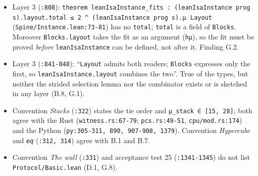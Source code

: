 \begin{itemize}
\item Layer 3 (\texttt{:808}): \texttt{t\allowbreak{}h\allowbreak{}e\allowbreak{}o\allowbreak{}r\allowbreak{}e\allowbreak{}m\allowbreak{} l\allowbreak{}e\allowbreak{}a\allowbreak{}n\allowbreak{}I\allowbreak{}s\allowbreak{}a\allowbreak{}I\allowbreak{}n\allowbreak{}s\allowbreak{}t\allowbreak{}a\allowbreak{}n\allowbreak{}c\allowbreak{}e\allowbreak{}\_\allowbreak{}f\allowbreak{}i\allowbreak{}t\allowbreak{}s\allowbreak{} :\allowbreak{} (\allowbreak{}l\allowbreak{}e\allowbreak{}a\allowbreak{}n\allowbreak{}I\allowbreak{}s\allowbreak{}a\allowbreak{}I\allowbreak{}n\allowbreak{}s\allowbreak{}t\allowbreak{}a\allowbreak{}n\allowbreak{}c\allowbreak{}e\allowbreak{} p\allowbreak{}r\allowbreak{}o\allowbreak{}g\allowbreak{} s\allowbreak{})\allowbreak{}.\allowbreak{}l\allowbreak{}a\allowbreak{}y\allowbreak{}o\allowbreak{}u\allowbreak{}t\allowbreak{}.\allowbreak{}t\allowbreak{}o\allowbreak{}t\allowbreak{}a\allowbreak{}l\allowbreak{} ≤\allowbreak{} 2\allowbreak{} \textasciicircum{}\allowbreak{} (\allowbreak{}l\allowbreak{}e\allowbreak{}a\allowbreak{}n\allowbreak{}I\allowbreak{}s\allowbreak{}a\allowbreak{}I\allowbreak{}n\allowbreak{}s\allowbreak{}t\allowbreak{}a\allowbreak{}n\allowbreak{}c\allowbreak{}e\allowbreak{} p\allowbreak{}r\allowbreak{}o\allowbreak{}g\allowbreak{} s\allowbreak{})\allowbreak{}.\allowbreak{}μ}. \texttt{Layout} (\texttt{Spine/\allowbreak{}Instance.\allowbreak{}lean:73-{}81}) has no \texttt{total}; \texttt{total} is a field of \texttt{Blocks}. Moreover \texttt{Blocks.\allowbreak{}layout} takes the fit as an argument (\texttt{hμ}), so the fit must be proved \emph{before} \texttt{leanIsaInstance} can be defined, not after it. Finding G.2.
\item Layer 3 (\texttt{:841-{}848}): \enquote{\texttt{Layout} admits both readers; \texttt{Blocks} expresses only the first, so \texttt{leanIsaInstance.\allowbreak{}layout} combines the two}. True of the types, but neither the strided selection lemma nor the combinator exists or is sketched in any layer (B.8, G.1).
\item Convention \emph{Stacks} (\texttt{:322}) states the tie order and \texttt{μ\_\allowbreak{}stack ∈ [15,\allowbreak{} 28]}; both agree with the Rust (\texttt{witness.\allowbreak{}rs:67-{}79}; \texttt{pcs.\allowbreak{}rs:49-{}51}, \texttt{cpu/\allowbreak{}mod.\allowbreak{}rs:174}) and the Python (\texttt{p\allowbreak{}y\allowbreak{}:\allowbreak{}3\allowbreak{}0\allowbreak{}5\allowbreak{}-{}\allowbreak{}3\allowbreak{}1\allowbreak{}1\allowbreak{},\allowbreak{} 8\allowbreak{}9\allowbreak{}0\allowbreak{},\allowbreak{} 9\allowbreak{}0\allowbreak{}7\allowbreak{}-{}\allowbreak{}9\allowbreak{}0\allowbreak{}8\allowbreak{},\allowbreak{} 1\allowbreak{}3\allowbreak{}7\allowbreak{}9}). Convention \emph{Hypercube} and \emph{\texttt{eq}} (\texttt{:312,\allowbreak{} 314}) agree with B.1 and B.7.
\item Convention \emph{The wall} (\texttt{:331}) and acceptance test 25 (\texttt{:1341-{}1345}) do not list \texttt{Protocol/\allowbreak{}Basic.\allowbreak{}lean} (D.1, G.8).
\end{itemize}
